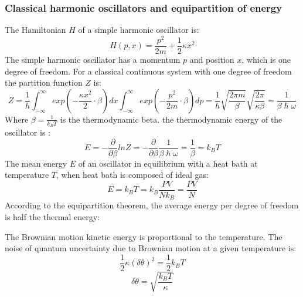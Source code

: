 \documentclass[\main/master.tex]{subfiles}
\begin{document}
\subsubsection{Classical harmonic oscillators and equipartition of energy}
The Hamiltonian $H$ of a simple harmonic oscillator is:
\begin{equation}
H(p,x) = \frac{p^2}{2m}+\frac{1}{2}\kappa x^2
\label{eqn:Hamiltonian}
\end{equation}
The simple harmonic oscillator has a momentum $p$ and position $x$, which is one degree of freedom. For a classical continuous system with one degree of freedom the partition function $Z$ is:
\begin{equation}
Z = \frac{1}{h}\int_{-\infty}^{\infty}exp(-\frac{\kappa x^2}{2}\cdot \beta)dx \int_{-\infty}^{\infty} exp(-\frac{p^2}{2m}\cdot \beta)dp = 
\frac{1}{h} \sqrt{\frac{2\pi m}{\beta}} \sqrt{\frac{2\pi }{\kappa\beta} } = \frac{1}{\beta\hslash\omega}
\label{eqn:partition function}
\end{equation}
Where $\beta = \frac{1}{k_B T}$ is the thermodynamic beta. the thermodynamic energy of the oscillator is : 
\begin{equation}
E = -\frac{\partial}{\partial\beta}lnZ = -\frac{\partial}{\partial\beta}\frac{1}{\beta\hslash\omega} = \frac{1}{\beta}  = k_B T
\label{eqn:thermodynamic energy}
\end{equation}
The mean energy $E$ of an oscillator in equilibrium with a heat bath at temperature $T$, when heat bath is composed of ideal gas:
\begin{equation}
E = k_B T = k_B\frac{PV}{N k_B} = \frac{PV}{N}
\label{eqn:Brownian uncertainty}
\end{equation}
According to the equipartition theorem, the average energy per degree of freedom is half the thermal
energy:

The Brownian motion kinetic energy is proportional to the temperature. The noise of quantum uncertainty due to Brownian motion at a given temperature is: 
\begin{equation}
\frac{1}{2}\kappa (\delta\theta)^2= \frac{1}{2}k_BT  \label{eqn:Brownian uncertainty}
\end{equation}
\begin{equation}
\delta\theta = \sqrt{\frac{k_B T}{\kappa}}  \label{eqn:Brownian uncertainty 2}
\end{equation}
\fi
\end{document}
